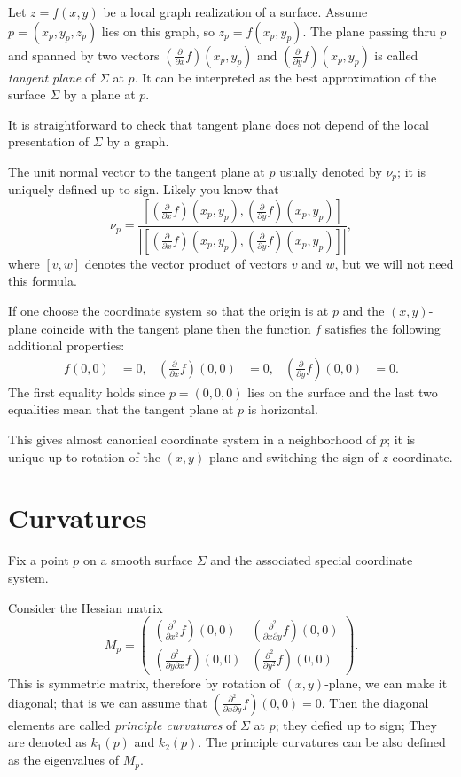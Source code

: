 Let $z=f(x,y)$ be a local graph realization of a surface. 
Assume $p=(x_p,y_p,z_p)$ lies on this graph, so $z_p=f(x_p,y_p)$.
The plane passing thru $p$ and spanned by two vectors $(\tfrac{\partial}{\partial x}f)(x_p,y_p)$ and  $(\tfrac{\partial}{\partial y}f)(x_p,y_p)$ is called \emph{tangent plane} of $\Sigma$ at $p$.
It can be interpreted as the best approximation of the surface $\Sigma$ by a plane at $p$.

It is straightforward to check that tangent plane does not depend of the local presentation of $\Sigma$ by a graph.

The unit normal vector to the tangent plane at $p$ usually denoted by $\nu_p$; it is uniquely defined up to sign. Likely you know that 
\[\nu_p=\frac{[(\tfrac{\partial}{\partial x}f)(x_p,y_p),(\tfrac{\partial}{\partial y}f)(x_p,y_p)]}{|[(\tfrac{\partial}{\partial x}f)(x_p,y_p),(\tfrac{\partial}{\partial y}f)(x_p,y_p)]|},\]
where $[v,w]$ denotes the vector product of vectors $v$ and $w$,
but we will not need this formula.

If one choose the coordinate system so that the origin is at $p$ and the $(x,y)$-plane coincide with the tangent plane then the function $f$ satisfies the following additional properties:
\begin{align*}
f(0,0)&=0,
&
(\tfrac{\partial}{\partial x}f)(0,0)&=0,
&
(\tfrac{\partial}{\partial y}f)(0,0)&=0.
\end{align*}
The first equality holds since $p=(0,0,0)$ lies on the surface and the last two equalities mean that the tangent plane at $p$ is horizontal.

This gives almost canonical coordinate system in a neighborhood of $p$;
it is unique up to rotation of  the $(x,y)$-plane and switching the sign of $z$-coordinate.

\section{Curvatures}

Fix a point $p$ on a smooth surface $\Sigma$ and the associated special coordinate system. 

Consider the Hessian matrix 
\[M_p=\begin{pmatrix}
   (\tfrac{\partial^2}{\partial x^2}f)(0,0)
   &(\tfrac{\partial^2}{\partial x\partial y}f)(0,0)
   \\
   (\tfrac{\partial^2}{\partial y\partial x}f)(0,0)
   &(\tfrac{\partial^2}{\partial y^2}f)(0,0)
  \end{pmatrix}.
\]
This is symmetric matrix, therefore by rotation of $(x,y)$-plane, we can make it diagonal;
that is we can assume that $(\tfrac{\partial^2}{\partial x\partial y}f)(0,0)=0$.
Then the diagonal elements are called \emph{principle curvatures} of $\Sigma$ at $p$;
they defied up to sign;
They are denoted as $k_1(p)$ and $k_2(p)$.
The principle curvatures can be also defined as the eigenvalues of $M_p$.


